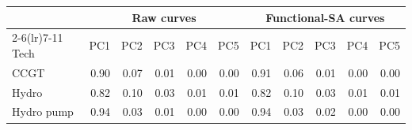 \begin{tabular}{l r r r r r r r r r r}
\toprule
 & \multicolumn{5}{c}{Raw curves} & \multicolumn{5}{c}{Functional-SA curves} \\
\cmidrule(lr){2-6}\cmidrule(lr){7-11}
Tech & PC1 & PC2 & PC3 & PC4 & PC5 & PC1 & PC2 & PC3 & PC4 & PC5 \\
\midrule
CCGT & 0.90 & 0.07 & 0.01 & 0.00 & 0.00 & 0.91 & 0.06 & 0.01 & 0.00 & 0.00 \\
Hydro & 0.82 & 0.10 & 0.03 & 0.01 & 0.01 & 0.82 & 0.10 & 0.03 & 0.01 & 0.01 \\
Hydro pump & 0.94 & 0.03 & 0.01 & 0.00 & 0.00 & 0.94 & 0.03 & 0.02 & 0.00 & 0.00 \\
\bottomrule
\end{tabular}